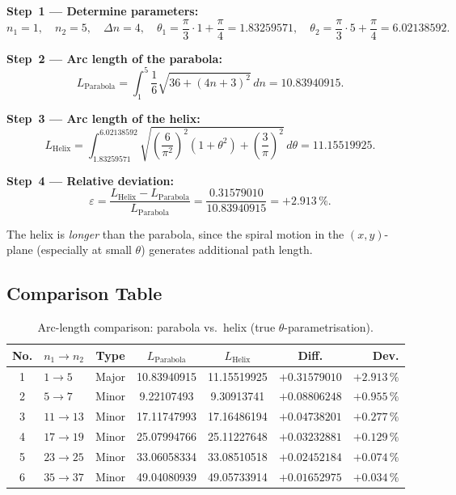 \textbf{Step~1 --- Determine parameters:}
\[
n_1 = 1,\quad n_2 = 5,\quad \Delta n = 4,\quad
\theta_1 = \frac{\pi}{3}\cdot 1 + \frac{\pi}{4} = 1.83259571,\quad
\theta_2 = \frac{\pi}{3}\cdot 5 + \frac{\pi}{4} = 6.02138592.
\]

\textbf{Step~2 --- Arc length of the parabola:}
\[
L_{\text{Parabola}}
= \int_{1}^{5} \frac{1}{6}\sqrt{36 + (4n+3)^2}\, dn
= \boxed{10.83940915}.
\]

\textbf{Step~3 --- Arc length of the helix:}
\[
L_{\text{Helix}}
= \int_{1.83259571}^{6.02138592}
  \sqrt{\left(\frac{6}{\pi^2}\right)^2(1 + \theta^2)
  + \left(\frac{3}{\pi}\right)^2}\, d\theta
= \boxed{11.15519925}.
\]

\textbf{Step~4 --- Relative deviation:}
\[
\varepsilon = \frac{L_{\text{Helix}} - L_{\text{Parabola}}}{L_{\text{Parabola}}}
= \frac{0.31579010}{10.83940915} = \boxed{+2.913\,\%}.
\]

\begin{remark}\label{rem:helix-longer}
The helix is \emph{longer} than the parabola, since the spiral motion in
the $(x,y)$-plane (especially at small $\theta$) generates additional
path length.
\end{remark}

\subsection{Comparison Table}

\begin{table}[H]
\centering
\caption{Arc-length comparison: parabola vs.\ helix
  (true $\theta$-parametrisation).}
\label{tab:arc-length-comparison}
\begin{tabular}{clccccr}
\toprule
No. & $n_1 \to n_2$ & Type
  & $L_{\text{Parabola}}$ & $L_{\text{Helix}}$
  & Diff. & Dev. \\
\midrule
1 & $1 \to 5$   & Major
  & 10.83940915 & 11.15519925 & $+0.31579010$ & $+2.913\,\%$ \\
2 & $5 \to 7$   & Minor
  & 9.22107493  & 9.30913741  & $+0.08806248$ & $+0.955\,\%$ \\
3 & $11 \to 13$ & Minor
  & 17.11747993 & 17.16486194 & $+0.04738201$ & $+0.277\,\%$ \\
4 & $17 \to 19$ & Minor
  & 25.07994766 & 25.11227648 & $+0.03232881$ & $+0.129\,\%$ \\
5 & $23 \to 25$ & Minor
  & 33.06058334 & 33.08510518 & $+0.02452184$ & $+0.074\,\%$ \\
6 & $35 \to 37$ & Minor
  & 49.04080939 & 49.05733914 & $+0.01652975$ & $+0.034\,\%$ \\
\bottomrule
\end{tabular}
\end{table}

